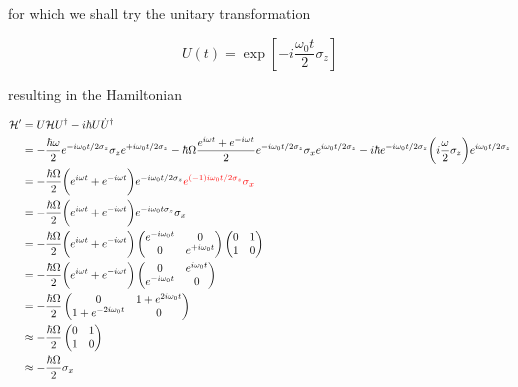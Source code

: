   \noindent for which we shall try the unitary transformation
  
  \begin{equation}\label{app2Try}
    U(t) = \exp\left[-i\frac{\omega_0 t}{2}\sigma_z\right]
  \end{equation}  
  
  \noindent resulting in the Hamiltonian
  
  \begin{equation}\label{app2New}
    \begin{aligned}
      \mathcal{H'} & = U\mathcal{H}U^{\dagger} - i\hbar U\dot{U}^{\dagger}\\
      & = -\frac{\hbar\omega}{2}e^{-i\omega_0t/2\sigma_z}\sigma_ze^{+i\omega_0t/2\sigma_z}-\hbar\Omega\frac{e^{i\omega t}+e^{-i\omega t}}{2}e^{-i\omega_0t/2\sigma_z}\sigma_xe^{i\omega_0t/2\sigma_z}- i\hbar e^{-i\omega_0t/2\sigma_z}\bigg(i\frac{\omega}{2}\sigma_z\bigg)e^{i\omega_0t/2\sigma_z}\\
      & = -\frac{\hbar\Omega}{2}\bigg(e^{i\omega t}+e^{-i\omega t}\bigg)e^{-i\omega_0t/2\sigma_z}{\color{red}{e^{(-1)i\omega_0t/2\sigma_z}\sigma_x}}\\
      & = -\frac{\hbar\Omega}{2}\bigg(e^{i\omega t}+e^{-i\omega t}\bigg){e^{-i\omega_0t\sigma_z}\sigma_x}\\
      &    =-\frac{\hbar\Omega}{2}\bigg(e^{i\omega   t}+e^{-i\omega    t}\bigg)\begin{pmatrix}
        e^{-i\omega_0t}&0\\0&e^{+i\omega_0t}
      \end{pmatrix}\begin{pmatrix}
        0&1\\1&0
      \end{pmatrix}\\
      &    =-\frac{\hbar\Omega}{2}\bigg(e^{i\omega   t}+e^{-i\omega    t}\bigg)\begin{pmatrix}
        0&e^{i\omega_0t}\\e^{-i\omega_0t}&0
      \end{pmatrix}
      \\
      & =-\frac{\hbar\Omega}{2}\begin{pmatrix} 0&1+e^{2i\omega_0t}\\1+e^{-2i\omega_0t}&0
      \end{pmatrix}
      \\
      & \approx -\frac{\hbar\Omega}{2}\begin{pmatrix} 0&1\\1&0
      \end{pmatrix}
      \\
      & \approx -\frac{\hbar\Omega}{2}\sigma_x
    \end{aligned}
  \end{equation}
  
